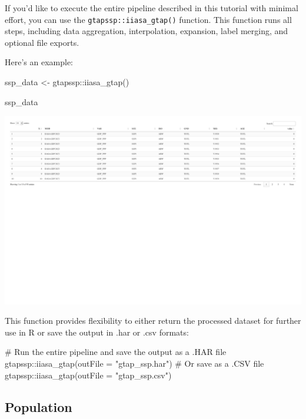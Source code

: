 \documentclass[
  letterpaper,
  DIV=11,
  numbers=noendperiod]{scrartcl}
\newenvironment{Shaded}{}{}
\newcommand{\AttributeTok}[1]{\textcolor[rgb]{0.00,0.34,0.68}{#1}}
\newcommand{\CommentTok}[1]{\textcolor[rgb]{0.54,0.53,0.53}{#1}}
\newcommand{\FunctionTok}[1]{\textcolor[rgb]{0.39,0.29,0.61}{#1}}
\newcommand{\NormalTok}[1]{\textcolor[rgb]{0.12,0.11,0.11}{#1}}
\newcommand{\OtherTok}[1]{\textcolor[rgb]{0.00,0.43,0.16}{#1}}
\newcommand{\SpecialCharTok}[1]{\textcolor[rgb]{0.24,0.68,0.91}{#1}}
\newcommand{\StringTok}[1]{\textcolor[rgb]{0.75,0.01,0.01}{#1}}
\begin{document}
If you'd like to execute the entire pipeline described in this tutorial
with minimal effort, you can use the \texttt{gtapssp::iiasa\_gtap()}
function. This function runs all steps, including data aggregation,
interpolation, expansion, label merging, and optional file exports.

Here's an example:

\begin{Shaded}
\begin{Highlighting}[]
\NormalTok{ssp\_data }\OtherTok{\textless{}{-}}\NormalTok{ gtapssp}\SpecialCharTok{::}\FunctionTok{iiasa\_gtap}\NormalTok{()}

\NormalTok{ssp\_data}
\end{Highlighting}
\end{Shaded}

\includegraphics{index_files/figure-pdf/unnamed-chunk-4-1.pdf}

This function provides flexibility to either return the processed
dataset for further use in R or save the output in .har or .csv formats:

\begin{Shaded}
\begin{Highlighting}[]
\CommentTok{\# Run the entire pipeline and save the output as a .HAR file}
\NormalTok{gtapssp}\SpecialCharTok{::}\FunctionTok{iiasa\_gtap}\NormalTok{(}\AttributeTok{outFile =} \StringTok{"gtap\_ssp.har"}\NormalTok{)}
\CommentTok{\# Or save as a .CSV file}
\NormalTok{gtapssp}\SpecialCharTok{::}\FunctionTok{iiasa\_gtap}\NormalTok{(}\AttributeTok{outFile =} \StringTok{"gtap\_ssp.csv"}\NormalTok{)}
\end{Highlighting}
\end{Shaded}

\subsection{Population}
\end{document}
